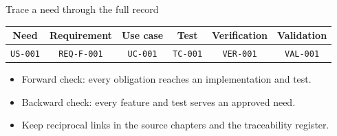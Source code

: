 \begin{frame}{Trace a need through the full record}
\centering
\small
\begin{tabular}{@{}cccccc@{}}
\toprule
Need & Requirement & Use case & Test & Verification & Validation \\
\midrule
\texttt{US-001} & \texttt{REQ-F-001} & \texttt{UC-001} & \texttt{TC-001} & \texttt{VER-001} & \texttt{VAL-001} \\
\bottomrule
\end{tabular}
\vspace{0.5cm}
\begin{itemize}
  \item Forward check: every obligation reaches an implementation and test.
  \item Backward check: every feature and test serves an approved need.
  \item Keep reciprocal links in the source chapters and the traceability register.
\end{itemize}
\end{frame}
